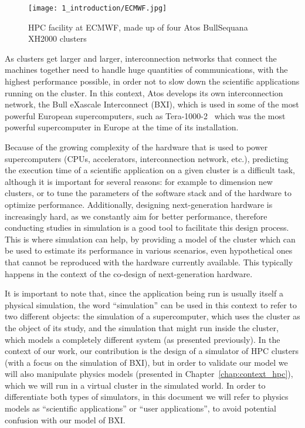 \begin{figure}[!ht]
    \centering
    \texttt{[image: 1\_introduction/ECMWF.jpg]}
    \caption[HPC facility at ECMWF, made up of four Atos BullSequana XH2000 clusters]{HPC facility at ECMWF, made up of four Atos BullSequana XH2000 clusters\protect\footnotemark}
    \label{fig:1_introduction:ECMWF}
\end{figure}


As clusters get larger and larger, interconnection networks that connect the
machines together need to handle huge quantities of communications, with the
highest performance possible, in order not to slow down the scientific
applications running on the cluster. In this context, Atos develops its own
interconnection network, the Bull eXascale Interconnect (BXI), which is used in
some of the most powerful European supercomputers, such as
Tera-1000-2~\cite{top500_tera1000} which was the most powerful supercomputer in
Europe at the time of its installation.

Because of the growing complexity of the hardware that is used to power
supercomputers (CPUs, accelerators, interconnection network, etc.), predicting
the execution time of a scientific application on a given cluster is a difficult
task, although it is important for several reasons: for example to dimension new
clusters, or to tune the parameters of the software stack and of the hardware to
optimize performance. Additionally, designing next-generation hardware is
increasingly hard, as we constantly aim for better performance, therefore
conducting studies in simulation is a good tool to facilitate this design
process. This is where simulation can help, by providing a model of the cluster
which can be used to estimate its performance in various scenarios, even
hypothetical ones that cannot be reproduced with the hardware currently
available. This typically happens in the context of the co-design of
next-generation hardware. 

It is important to note that, since the application being run is usually itself
a physical simulation, the word ``simulation'' can be used in this context to
refer to two different objects: the simulation of a supercomputer, which uses
the cluster as the object of its study, and the simulation that might run inside
the cluster, which models a completely different system (as presented
previously). In the context of our work, our contribution is the design of a
simulator of HPC clusters (with a focus on the simulation of BXI), but in order
to validate our model we will also manipulate physics models (presented in
Chapter~\ref{chap:context_hpc}), which we will run in a virtual cluster in the
simulated world. In order to differentiate both types of simulators, in this
document we will refer to physics models as ``scientific applications'' or
``user applications'', to avoid potential confusion with our model of BXI.


